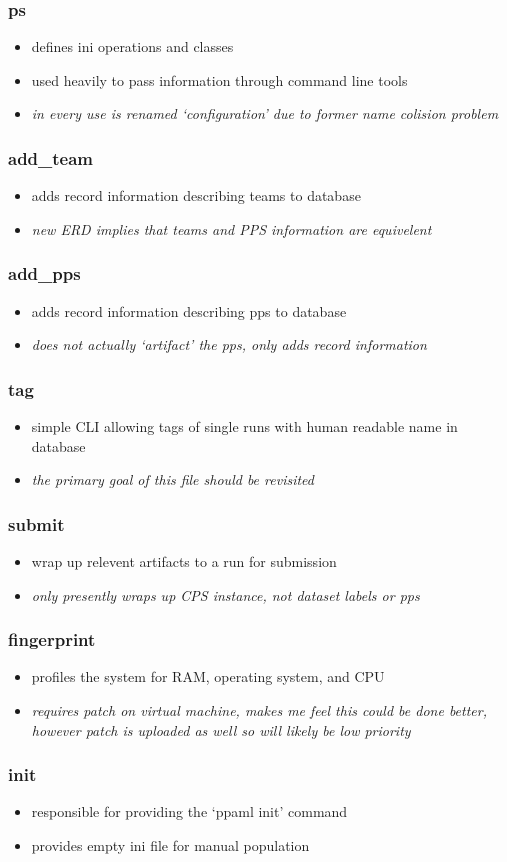 \documentclass[11pt]{article} %
\newenvironment{mitemize}[1]{
  \begin{minipage}{\columnwidth}
  \subsubsection*{#1}
  \begin{itemize}
    \setlength{\topsep}{0pt}
    \setlength{\itemsep}{1pt}
    \setlength{\parsep}{0pt}
    \setlength{\parskip}{0pt}
}{\end{itemize}\end{minipage}}
\begin{document}
\begin{multicols}{2}
\begin{mitemize}{ps}
\item defines ini operations and classes
\item used heavily to pass information through command line tools
\item {\em in every use is renamed `configuration' due to former name colision problem}
\end{mitemize}

\begin{mitemize}{add\_team}
\item adds record information describing teams to database
\item {\em new ERD implies that teams and PPS information are equivelent}
\end{mitemize}

\begin{mitemize}{add\_pps}
\item adds record information describing pps to database
\item {\em does not actually `artifact' the pps, only adds record information}
\end{mitemize}

\begin{mitemize}{tag}
\item simple CLI allowing tags of single runs with human readable name in database
\item {\em the primary goal of this file should be revisited}
\end{mitemize}

\begin{mitemize}{submit}
\item wrap up relevent artifacts to a run for submission
\item {\em only presently wraps up CPS instance, not dataset labels or pps}
\end{mitemize}

\begin{mitemize}{fingerprint}
\item profiles the system for RAM, operating system, and CPU
\item {\em requires patch on virtual machine, makes me feel this could be done better, however patch is uploaded as well so will likely be low priority}
\end{mitemize}

\begin{mitemize}{init}
\item responsible for providing the `ppaml init' command
\item provides empty ini file for manual population
\end{mitemize}
\end{multicols}
\end{document}
